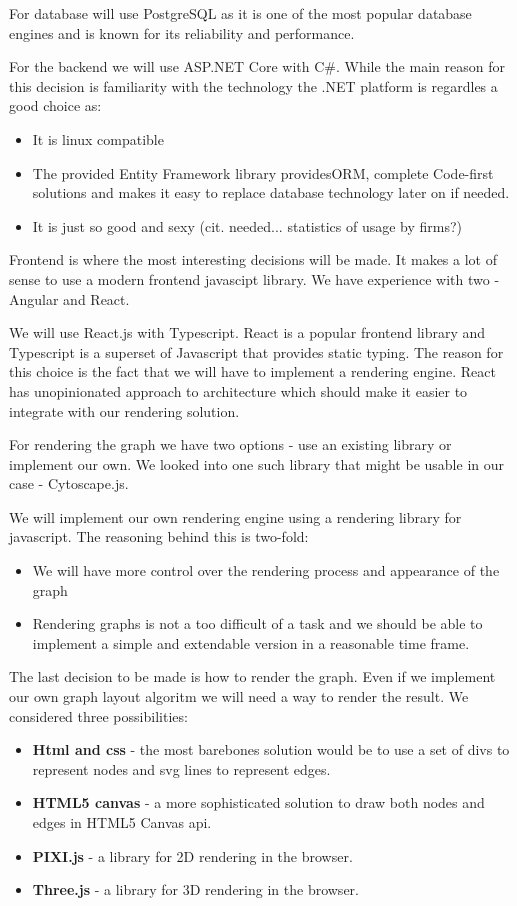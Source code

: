 For database will use PostgreSQL as it is one of the most popular database engines and is known for its reliability and performance.

For the backend we will use ASP.NET Core with C\#.
While the main reason for this decision is familiarity with the technology the .NET platform is regardles a good choice as:
\begin{itemize}
    \item It is linux compatible
    \item The provided Entity Framework library providesORM, complete Code-first solutions and makes it easy to replace database technology later on if needed.
    \item It is just so good and sexy (cit. needed... statistics of usage by firms?) 
\end{itemize}

Frontend is where the most interesting decisions will be made. It makes a lot of sense to use a modern frontend javascipt library.
We have experience with two - Angular and React.

We will use React.js with Typescript. React is a popular frontend library and Typescript is a superset of Javascript that provides static typing.
The reason for this choice is the fact that we will have to implement a rendering engine.
React has unopinionated approach to architecture which should make it easier to integrate with our rendering solution.

For rendering the graph we have two options - use an existing library or implement our own.
We looked into one such library that might be usable in our case - Cytoscape.js.

We will implement our own rendering engine using a rendering library for javascript. The reasoning behind this is two-fold:
\begin{itemize}
    \item We will have more control over the rendering process and appearance of the graph
    \item Rendering graphs is not a too difficult of a task and we should be able to implement a simple and extendable version in a reasonable time frame.
\end{itemize}

The last decision to be made is how to render the graph.
Even if we implement our own graph layout algoritm we will need a way to render the result.
We considered three possibilities:
\begin{itemize}
    \item \textbf{Html and css} - the most barebones solution would be to use a set of divs to represent nodes and svg lines to represent edges.
    \item \textbf{HTML5 canvas} - a more sophisticated solution to draw both nodes and edges in HTML5 Canvas api.
    \item \textbf{PIXI.js} - a library for 2D rendering in the browser.
    \item \textbf{Three.js} - a library for 3D rendering in the browser.
\end{itemize}

